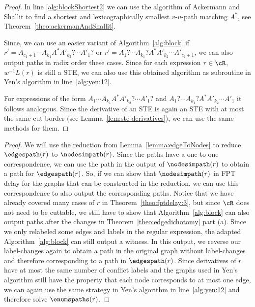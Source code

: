 \documentclass[a4paper,english]{lipics-v2016}
\theoremstyle{plain}
\begin{document}
\begin{proof}
 In line \ref{alg:blockShortest2} we can use the algorithm of Ackermann and Shallit \cite{Ackerman-TCS09} to find a shortest and lexicographically smallest $v$-$u$-path matching $A^*$, see Theorem~\ref{theo:ackermanAndShallit}.
 
 Since, we can use an easier variant of Algorithm~\ref{alg:block} if $r' = A_{c_1+1} \cdots A_{k_1} A^* A'_{k_2}? \cdots A'_{1}?$ or $r' = A_{1}? \cdots A_{k_1}? A^* A'_{k_2} \cdots A'_{c_2+1}$, we can also output paths in radix order these cases. 
 Since for each expression $r \in \cR$, $w^{-1}L(r)$ is still a STE, we can also use this obtained algorithm as subroutine in Yen's algorithm in line~\ref{alg:yen:12}.

 For expressions of the form $A_1 \cdots A_{k_1} A^* A'_{k_2}? \cdots A'_1?$ and $A_1? \cdots A_{k_1}? A^* A'_{k_2} \cdots A'_1$ it follows analogous. 
 Since the derivative of an STE is again an STE with at most the same cut border (see Lemma~\ref{lem:ste-derivatives}), we can use the same methods for them.
 \end{proof}


\fptdelayedge*
\begin{proof}
	We will use the reduction from Lemma~\ref{lemma:edgeToNodes} to reduce $\edgespath(r)$ to $\nodesimpath(r)$. Since the paths have a one-to-one correspondence, we can use the path in the output of $\nodesimpath(r)$ to obtain a path for $\edgespath(r)$. So, if we can show that $\nodesimpath(r)$ in FPT delay for the graphs that can be constructed in the reduction, we can use this correspondence to also output the corresponding paths. Notice that we have already covered many cases of $r$ in Theorem~\ref{theo:fptdelay:3}, but since $\cR$ does not need to be cuttable, we still have to show that Algorithm~\ref{alg:block} can also output paths after the changes in Theorem~\ref{theo:edgedichotomy} part (a).
	Since we only relabeled some edges and labels in the regular expression, the adapted Algorithm~\ref{alg:block} can still output a witness. In this output, we reverse our label-changes again to obtain a path in the original graph without label-changes and therefore corresponding to a path in $\edgespath(r)$. 
	Since derivatives of $r$ have at most the same number of conflict labels and the graphs used in Yen's algorithm still have the property that each node corresponds to at most one edge, we can again use the same strategy in Yen's algorithm in line~\ref{alg:yen:12} and therefore solve $\enumspaths(r)$.
\end{proof}
\end{document}
